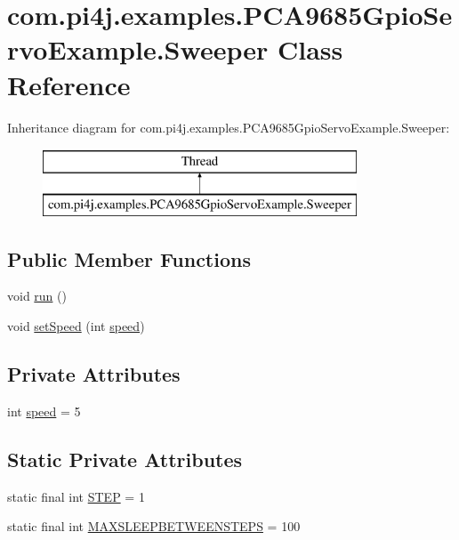 \hypertarget{classcom_1_1pi4j_1_1examples_1_1PCA9685GpioServoExample_1_1Sweeper}{}\section{com.\+pi4j.\+examples.\+P\+C\+A9685\+Gpio\+Servo\+Example.\+Sweeper Class Reference}
\label{classcom_1_1pi4j_1_1examples_1_1PCA9685GpioServoExample_1_1Sweeper}
Inheritance diagram for com.\+pi4j.\+examples.\+P\+C\+A9685\+Gpio\+Servo\+Example.\+Sweeper\+:\begin{figure}[H]
\begin{center}
\leavevmode
\includegraphics[height=2.000000cm]{classcom_1_1pi4j_1_1examples_1_1PCA9685GpioServoExample_1_1Sweeper}
\end{center}
\end{figure}
\subsection*{Public Member Functions}
\begin{DoxyCompactItemize}
\item 
void \hyperlink{classcom_1_1pi4j_1_1examples_1_1PCA9685GpioServoExample_1_1Sweeper_aa4e3dc19ea42e5fe72f0dbdcda223471}{run} ()
\item 
void \hyperlink{classcom_1_1pi4j_1_1examples_1_1PCA9685GpioServoExample_1_1Sweeper_a033c9258bceb96d71b5a6adfacb04976}{set\+Speed} (int \hyperlink{classcom_1_1pi4j_1_1examples_1_1PCA9685GpioServoExample_1_1Sweeper_a687365830c8cf1d68b44afc369bed00f}{speed})
\end{DoxyCompactItemize}
\subsection*{Private Attributes}
\begin{DoxyCompactItemize}
\item 
int \hyperlink{classcom_1_1pi4j_1_1examples_1_1PCA9685GpioServoExample_1_1Sweeper_a687365830c8cf1d68b44afc369bed00f}{speed} = 5
\end{DoxyCompactItemize}
\subsection*{Static Private Attributes}
\begin{DoxyCompactItemize}
\item 
static final int \hyperlink{classcom_1_1pi4j_1_1examples_1_1PCA9685GpioServoExample_1_1Sweeper_a5616b6c917a05769e3b3344710f6db3f}{S\+T\+E\+P} = 1
\item 
static final int \hyperlink{classcom_1_1pi4j_1_1examples_1_1PCA9685GpioServoExample_1_1Sweeper_a7643dfab6ffcfd44d60f83b03b507ab1}{M\+A\+X\+S\+L\+E\+E\+P\+B\+E\+T\+W\+E\+E\+N\+S\+T\+E\+P\+S} = 100
\end{DoxyCompactItemize}


